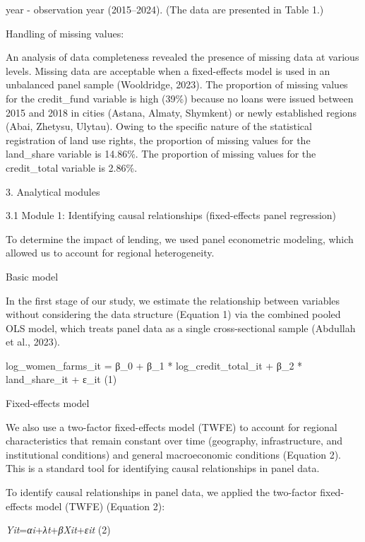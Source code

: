 \documentclass[
]{article}
\begin{document}
year - observation year (2015--2024). (The data are presented in Table
1.)

Handling of missing values:

An analysis of data completeness revealed the presence of missing data
at various levels. Missing data are acceptable when a fixed-effects
model is used in an unbalanced panel sample (Wooldridge, 2023). The
proportion of missing values for the credit\_fund variable is high
(39\%) because no loans were issued between 2015 and 2018 in cities
(Astana, Almaty, Shymkent) or newly established regions (Abai, Zhetysu,
Ulytau). Owing to the specific nature of the statistical registration of
land use rights, the proportion of missing values for the land\_share
variable is 14.86\%. The proportion of missing values for the
credit\_total variable is 2.86\%.

3. Analytical modules

3.1 Module 1: Identifying causal relationships (fixed-effects panel
regression)

To determine the impact of lending, we used panel econometric modeling,
which allowed us to account for regional heterogeneity.

Basic model

In the first stage of our study, we estimate the relationship between
variables without considering the data structure (Equation 1) via the
combined pooled OLS model, which treats panel data as a single
cross-sectional sample (Abdullah et al., 2023).

log\_women\_farms\_it = β\_0 + β\_1 * log\_credit\_total\_it + β\_2 *
land\_share\_it + ε\_it (1)

Fixed-effects model

We also use a two-factor fixed-effects model (TWFE) to account for
regional characteristics that remain constant over time (geography,
infrastructure, and institutional conditions) and general macroeconomic
conditions (Equation 2). This is a standard tool for identifying causal
relationships in panel data.

To identify causal relationships in panel data, we applied the
two-factor fixed-effects model (TWFE) (Equation 2):

\emph{Yit}\hspace{0pt}=\emph{αi}\hspace{0pt}+\emph{λt}\hspace{0pt}+\emph{βXit}\hspace{0pt}+\emph{εit}\hspace{0pt}
(2)
\end{document}
